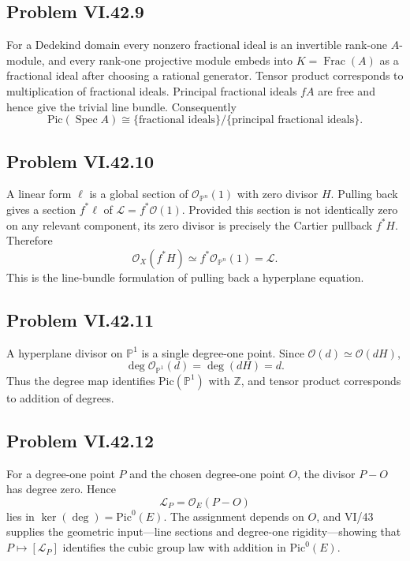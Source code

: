 \subsection*{Problem VI.42.9}
\begin{solution}
For a Dedekind domain every nonzero fractional ideal is an invertible rank-one \(A\)-module, and every rank-one projective module embeds into \(K=\operatorname{Frac}(A)\) as a fractional ideal after choosing a rational generator.  Tensor product corresponds to multiplication of fractional ideals.  Principal fractional ideals \(fA\) are free and hence give the trivial line bundle.  Consequently
\[
\mathrm{Pic}(\operatorname{Spec}A)
\cong\{\text{fractional ideals}\}/\{\text{principal fractional ideals}\}.
\]
\end{solution}

\subsection*{Problem VI.42.10}
\begin{solution}
A linear form \(\ell\) is a global section of \(\mathcal O_{\mathbb P^n}(1)\) with zero divisor \(H\).  Pulling back gives a section \(f^*\ell\) of \(\mathcal L=f^*\mathcal O(1)\).  Provided this section is not identically zero on any relevant component, its zero divisor is precisely the Cartier pullback \(f^*H\).  Therefore
\[
\mathcal O_X(f^*H)\simeq f^*\mathcal O_{\mathbb P^n}(1)=\mathcal L.
\]
This is the line-bundle formulation of pulling back a hyperplane equation.
\end{solution}

\subsection*{Problem VI.42.11}
\begin{solution}
A hyperplane divisor on \(\mathbb P^1\) is a single degree-one point.  Since \(\mathcal O(d)\simeq\mathcal O(dH)\),
\[
\deg\mathcal O_{\mathbb P^1}(d)=\deg(dH)=d.
\]
Thus the degree map identifies \(\mathrm{Pic}(\mathbb P^1)\) with \(\mathbb Z\), and tensor product corresponds to addition of degrees.
\end{solution}

\subsection*{Problem VI.42.12}
\begin{solution}
For a degree-one point \(P\) and the chosen degree-one point \(O\), the divisor \(P-O\) has degree zero.  Hence
\[
\mathcal L_P=\mathcal O_E(P-O)
\]
lies in \(\ker(\deg)=\mathrm{Pic}^0(E)\).  The assignment depends on \(O\), and VI/43 supplies the geometric input—line sections and degree-one rigidity—showing that \(P\mapsto[\mathcal L_P]\) identifies the cubic group law with addition in \(\mathrm{Pic}^0(E)\).
\end{solution}

